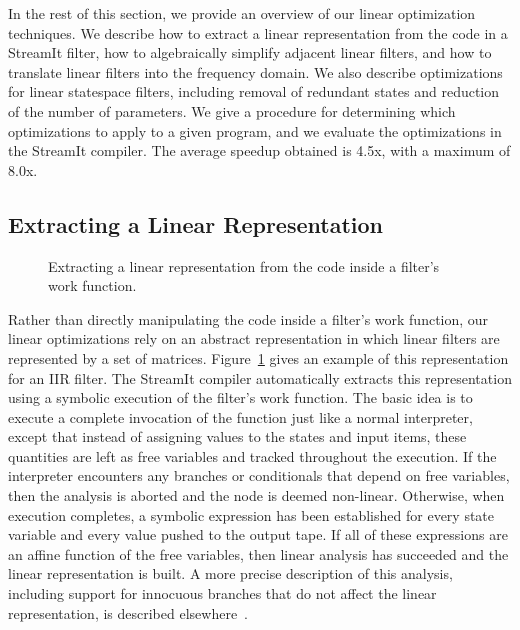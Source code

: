 In the rest of this section, we provide an overview of our linear
optimization techniques.  We describe how to extract a linear
representation from the code in a StreamIt filter, how to
algebraically simplify adjacent linear filters, and how to translate
linear filters into the frequency domain.  We also describe
optimizations for linear statespace filters, including removal of
redundant states and reduction of the number of parameters.  We give a
procedure for determining which optimizations to apply to a given
program, and we evaluate the optimizations in the StreamIt compiler.
The average speedup obtained is 4.5x, with a maximum of 8.0x.

\subsection*{Extracting a Linear Representation}

\begin{figure}[t]
\centering
{}
\caption[Extracting a linear representation]{Extracting a linear
  representation from the code inside a filter's work
  function.\protect\label{fig:extraction}}
\end{figure}

Rather than directly manipulating the code inside a filter's work
function, our linear optimizations rely on an abstract representation
in which linear filters are represented by a set of matrices.
Figure~\ref{fig:extraction} gives an example of this representation
for an IIR filter.  The StreamIt compiler automatically extracts this
representation using a symbolic execution of the filter's work
function.  The basic idea is to execute a complete invocation of the
function just like a normal interpreter, except that instead of
assigning values to the states and input items, these quantities are
left as free variables and tracked throughout the execution.  If the
interpreter encounters any branches or conditionals that depend on
free variables, then the analysis is aborted and the node is deemed
non-linear.  Otherwise, when execution completes, a symbolic
expression has been established for every state variable and every
value pushed to the output tape.  If all of these expressions are an
affine function of the free variables, then linear analysis has
succeeded and the linear representation is built.  A more precise
description of this analysis, including support for innocuous branches
that do not affect the linear representation, is described
elsewhere~\cite{lamb-pldi03}.

